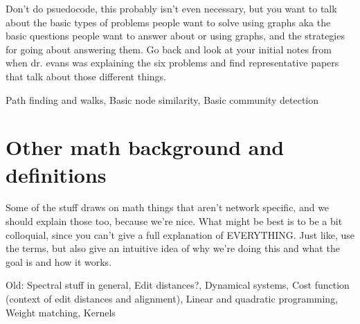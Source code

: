 \documentclass[12pt]{thesis}
\theoremstyle{plain}
\theoremstyle{definition}
\theoremstyle{remark}
\begin{document}
Don't do psuedocode, this probably isn't even necessary, but you want to talk about the basic types of problems people want to solve using graphs aka the basic questions people want to answer about or using graphs, and the strategies for going about answering them. Go back and look at your initial notes from when dr. evans was explaining the six problems and find representative papers that talk about those different things.

Path finding and walks, Basic node similarity, Basic community detection

\section{Other math background and definitions}

Some of the stuff draws on math things that aren't network specific, and we should explain those too, because we're nice. What might be best is to be a bit colloquial, since you can't give a full explanation of EVERYTHING. Just like, use the terms, but also give an intuitive idea of why we're doing this and what the goal is and how it works.

Old: Spectral stuff in general, Edit distances?, Dynamical systems, Cost function (context of edit distances and alignment), Linear and quadratic programming, Weight matching, Kernels








\end{document}

